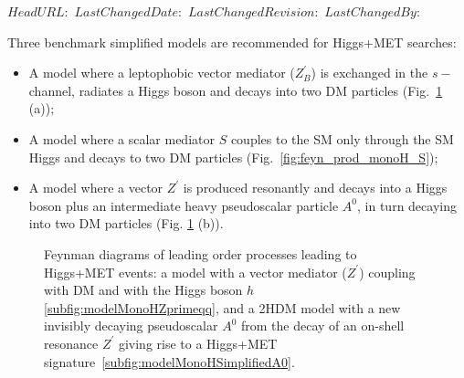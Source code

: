 \svnidlong
{$HeadURL: $}
{$LastChangedDate: $}
{$LastChangedRevision: $}
{$LastChangedBy: $}

Three benchmark simplified models \cite{Carpenter:2013xra,Berlin:2014cfa} 
are recommended for Higgs+MET searches:
\begin{itemize}
	\item A model where a leptophobic vector mediator ($Z_B^\prime$) is exchanged in the $s-$channel, 
	radiates a Higgs boson and decays into two DM particles (Fig.~\ref{fig:feyn_prod_monoH} (a));
    \item A model where a scalar mediator $S$ couples to the SM only 
	through the SM Higgs and decays to two DM particles (Fig.~\ref{fig:feyn_prod_monoH_S});
	\item A model where a vector $Z^\prime$ is produced resonantly and decays into a Higgs boson
	plus an intermediate heavy pseudoscalar particle $A^0$, in turn decaying into two DM particles (Fig. \ref{fig:feyn_prod_monoH} (b)). 
\end{itemize}


\begin{figure}[!h!tpd]
	\centering
	\textwidth
	\caption
	{
		Feynman diagrams of leading order processes leading to Higgs+MET events: a model with a vector mediator ($Z^\prime$) 
		coupling with DM and with the Higgs boson $h$ \ref{subfig:modelMonoHZprimeqq}, and
		a 2HDM model with a new invisibly decaying pseudoscalar $A^0$ 
		from the decay of an on-shell resonance $Z^\prime$ giving rise to a Higgs+MET signature~\ref{subfig:modelMonoHSimplifiedA0}.
	}
	\label{fig:feyn_prod_monoH}
\end{figure}
		
